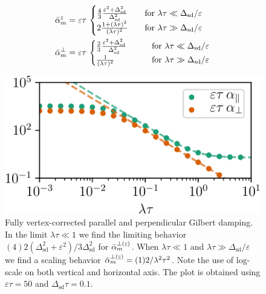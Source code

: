 \begin{align}
\label{eq:alphapara}
    \bar{\alpha}_m^{{\scriptscriptstyle\parallel}} &= 
    {\varepsilon\tau}\,  \begin{cases}
        \frac{4}{3}\frac{\varepsilon^2+\Delta_\text{sd}^2}{\Delta_\text{sd}^2}
            &\quad \text{for } \lambda\tau        \ll \Delta_\text{sd}/\varepsilon\\
        2\frac{1+(\lambda\tau)^2}{(\lambda\tau)^2}
            &\quad \text{for } \lambda\tau \gg \Delta_\text{sd}/\varepsilon 
    \end{cases}\\
    \label{eq:alphaperp}
    \bar{\alpha}_m^{\perp} &= {\varepsilon\tau}\,
    \begin{cases}
        \frac{2}{3}\frac{\varepsilon^2+\Delta_\text{sd}^2}{\Delta_\text{sd}^2}
            \quad\quad &\text{for } \lambda\tau        \ll \Delta_\text{sd}/\varepsilon\\
        \frac{1}{(\lambda\tau)^2}
            \quad &\text{for } \lambda\tau \gg \Delta_\text{sd}/\varepsilon 
    \end{cases}
\end{align}
\begin{figure}
    \centering
    \includegraphics[width=0.6\linewidth]{gfx/alpha_full2}
    \caption{Fully vertex-corrected parallel and perpendicular Gilbert damping. In the limit $\lambda\tau\ll1$ we find the limiting behavior $(4)2(\Delta_\text{sd}^2+\varepsilon^2)/3\Delta_\text{sd}^2$ for $\bar{\alpha}_m^{\perp({\scriptscriptstyle\parallel})}$. When $\lambda\tau\ll 1$ and $\lambda\tau\gg\Delta_\text{sd}/\varepsilon$ we find a scaling behavior $\bar{\alpha}_m^{\perp({\scriptscriptstyle\parallel})}=(1)2/\lambda^2\tau^2$. Note the use of log-scale on both vertical and horizontal axis. The plot is obtained using $\varepsilon\tau=50$ and $\Delta_\text{sd}\tau=0.1$. }
    \label{fig:alpha_plot_full}
\end{figure}



